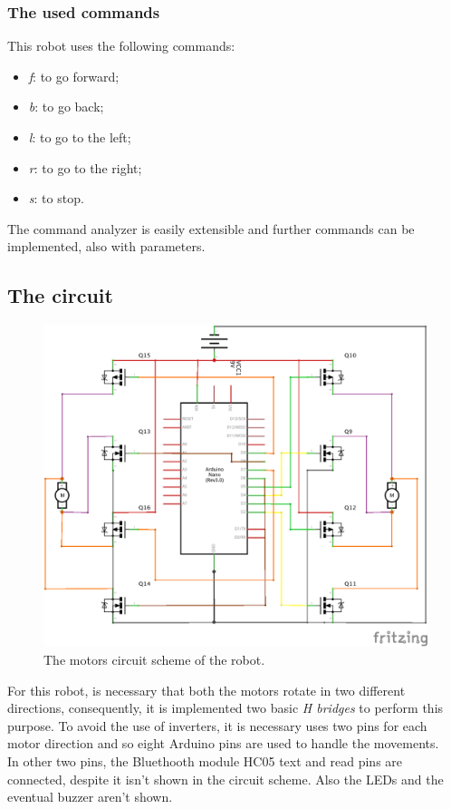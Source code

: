 \subsubsection{The used commands}
This robot uses the following commands:
\begin{itemize}
	\item \textit{f}: to go forward;
	\item \textit{b}: to go back;
	\item \textit{l}: to go to the left;
	\item \textit{r}: to go to the right;
	\item \textit{s}: to stop.
\end{itemize}
The command analyzer is easily extensible and further commands can be implemented, also with parameters.
\newpage

\subsection{The circuit}
\begin{figure}[h!]
	\centering
	\hspace*{-0.15 \textwidth}\includegraphics[width= 1.3\textwidth]
	{files/images/ReceiverScheme}
	\caption{The motors circuit scheme of the robot.}
\end{figure}
For this robot, is necessary that both the motors rotate in two different directions, consequently, it is implemented two basic \textit{H bridges} to perform this purpose. To avoid the use of inverters, it is necessary uses two pins for each motor direction and so eight Arduino pins are used to handle the movements.\\
In other two pins, the Bluethooth module HC05 text and read pins are connected, despite it isn't shown in the circuit scheme. Also the LEDs and the eventual buzzer aren't shown.